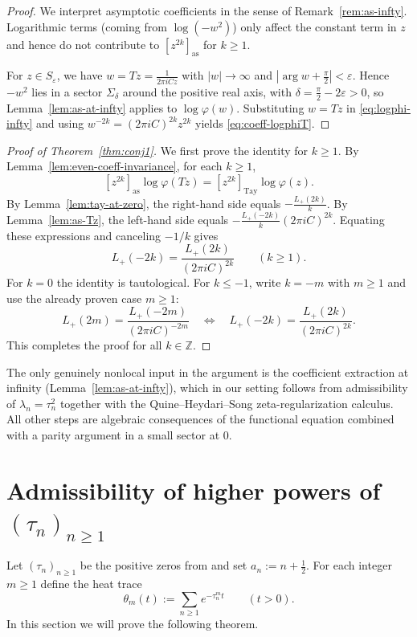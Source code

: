 \documentclass[11pt,letterpaper]{amsart}
\numberwithin{equation}{section}
\theoremstyle{definition}
\newcommand{\Z}{\mathbb{Z}}
\begin{document}
\begin{proof}
We interpret asymptotic coefficients in the sense of Remark~\ref{rem:as-infty}. Logarithmic terms (coming from $\log(-w^2)$) only affect the constant term in $z$ and hence do not contribute to $[z^{2k}]_{\mathrm{as}}$ for $k\ge1$.

For $z\in S_\varepsilon$, we have $w=Tz=\frac{1}{2\pi i C z}$ with $|w|\to\infty$ and
$|\arg w+\frac{\pi}{2}|<\varepsilon$. Hence $-w^2$ lies in a sector $\Sigma_\delta$ around the positive real axis,
with $\delta=\frac{\pi}{2}-2\varepsilon>0$, so Lemma~\ref{lem:as-at-infty} applies to $\log\varphi(w)$.
Substituting $w=Tz$ in \eqref{eq:logphi-infty} and using $w^{-2k}=(2\pi i C)^{2k}z^{2k}$ yields
\eqref{eq:coeff-logphiT}.
\end{proof}



\begin{proof}[Proof of Theorem~\ref{thm:conj1}]
We first prove the identity for $k\ge1$.
By Lemma~\ref{lem:even-coeff-invariance}, for each $k\ge1$,
\[
[z^{2k}]_{\mathrm{as}}\log\varphi(Tz)=[z^{2k}]_{\mathrm{Tay}}\log\varphi(z).
\]
By Lemma~\ref{lem:tay-at-zero}, the right-hand side equals $-\frac{L_+(2k)}{k}$.
By Lemma~\ref{lem:as-Tz}, the left-hand side equals $-\frac{L_+(-2k)}{k}(2\pi i C)^{2k}$.
Equating these expressions and canceling $-1/k$ gives
\[
L_+(-2k)=\frac{L_+(2k)}{(2\pi i C)^{2k}}
\qquad(k\ge1).
\]
For $k=0$ the identity is tautological. For $k\le -1$, write $k=-m$ with $m\ge1$ and use the already proven
case $m\ge1$:
\[
L_+(2m)=\frac{L_+(-2m)}{(2\pi i C)^{-2m}}
\quad\Longleftrightarrow\quad
L_+(-2k)=\frac{L_+(2k)}{(2\pi i C)^{2k}}.
\]
This completes the proof for all $k\in\Z$.
\end{proof}

The only genuinely nonlocal input in the argument is the coefficient extraction at infinity (Lemma~\ref{lem:as-at-infty}), which in our setting follows from admissibility of $\lambda_n=\tau_n^2$ together with the Quine--Heydari--Song zeta-regularization calculus. All other steps are algebraic consequences of the functional equation \cite[(1.6)]{BOCRS} combined with a parity argument in a small sector at $0$.

\section{Admissibility of higher powers of $(\tau_n)_{n\geq 1}$}\label{sec:parity-dichotomy}

Let $(\tau_n)_{n\ge1}$ be the positive zeros from \cite{BOCRS} and set $a_n:=n+\tfrac12$.
For each integer $m\ge1$ define the heat trace
\[
\theta_m(t):=\sum_{n\ge1}e^{-\tau_n^m t}\qquad (t>0).
\]
In this section we will prove the following theorem.
\end{document}
